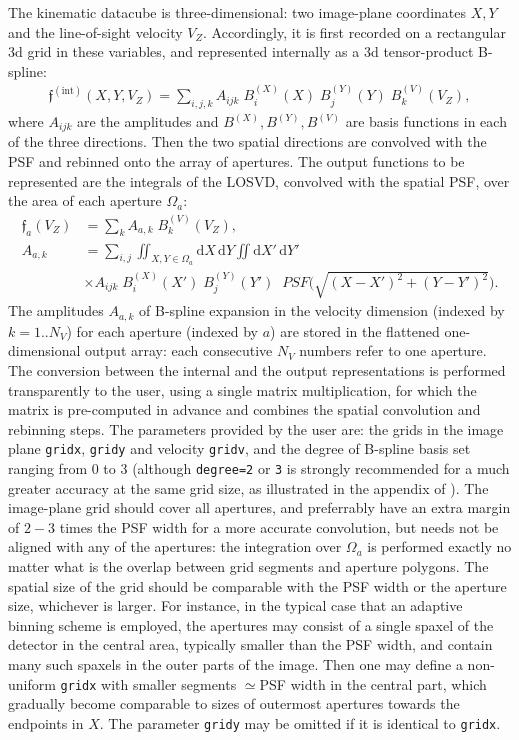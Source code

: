 \documentclass[12pt]{article}
\newcommand{\ppp}[1]{\textcolor{darkolive} {\texttt{#1}}}
\renewcommand{\d}{\mathrm{d}}
\begin{document}
The kinematic datacube is three-dimensional: two image-plane coordinates $X,Y$ and the line-of-sight velocity $V_Z$. Accordingly, it is first recorded on a rectangular 3d grid in these variables, and represented internally as a 3d tensor-product B-spline: 
\begin{align}  \label{eq:LOSVDinternal}
\mathfrak{f}^\mathrm{(int)}(X,Y,V_Z) = \sum_{i,j,k} A_{ijk}\;B^{(X)}_i(X)\;B^{(Y)}_j(Y)\;B^{(V)}_k(V_Z),
\end{align}
where $A_{ijk}$ are the amplitudes and $B^{(X)},B^{(Y)},B^{(V)}$ are basis functions in each of the three directions. Then the two spatial directions are convolved with the PSF and rebinned onto the array of apertures. The output functions to be represented are the integrals of the LOSVD, convolved with the spatial PSF, over the area of each aperture $\Omega_a$:
\begin{subequations}  \label{eq:LOSVDoutput}
\begin{align}
\mathfrak{f}_a(V_Z) &= \sum_{k} A_{a,k}\;B^{(V)}_k(V_Z), \\
A_{a,k} &= \sum_{i,j} \iint_{X,Y\in \Omega_a} 
\d X\, \d Y  \iint \d X'\, \d Y' \label{eq:LOSVDoutputAmpl} \\
&\times A_{ijk}\;B^{(X)}_i(X')\;B^{(Y)}_j(Y')\;\; PSF\big( \sqrt{ (X-X')^2 + (Y-Y')^2 } \big)  \nonumber.
\end{align}
\end{subequations}
The amplitudes $A_{a,k}$ of B-spline expansion in the velocity dimension (indexed by $k=1..N_V$) for each aperture (indexed by $a$) are stored in the flattened one-dimensional output array: each consecutive $N_V$ numbers refer to one aperture. The conversion between the internal and the output representations is performed transparently to the user, using a single matrix multiplication, for which the matrix is pre-computed in advance and combines the spatial convolution and rebinning steps. The parameters provided by the user are: the grids in the image plane \ppp{gridx}, \ppp{gridy} and velocity \ppp{gridv}, and the degree of B-spline basis set ranging from 0 to 3 (although \ppp{degree=2} or \ppp{3} is strongly recommended for a much greater accuracy at the same grid size, as illustrated in the appendix of \cite{VasilievValluri2020}). The image-plane grid should cover all apertures, and preferrably have an extra margin of $2-3$ times the PSF width for a more accurate convolution, but needs not be aligned with any of the apertures: the integration over $\Omega_a$ is performed exactly no matter what is the overlap between grid segments and aperture polygons. The spatial size of the grid should be comparable with the PSF width or the aperture size, whichever is larger. For instance, in the typical case that an adaptive binning scheme is employed, the apertures may consist of a single spaxel of the detector in the central area, typically smaller than the PSF width, and contain many such spaxels in the outer parts of the image. Then one may define a non-uniform \ppp{gridx} with smaller segments $\simeq$PSF width in the central part, which gradually become comparable to sizes of outermost apertures towards the endpoints in $X$. The parameter \ppp{gridy} may be omitted if it is identical to \ppp{gridx}.
\end{document}
